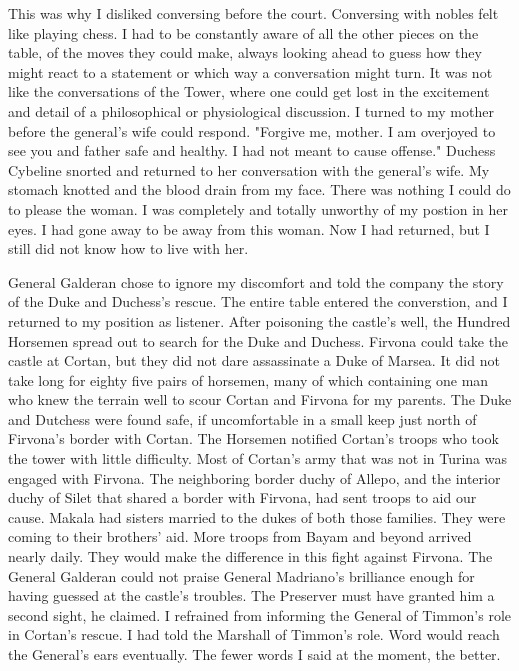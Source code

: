 \documentclass{article}
\begin{document}
This was why I disliked conversing before the court. Conversing with nobles felt like playing chess. I had to be constantly aware of all the other pieces on the table, of the moves they could make, always looking ahead to guess how they might react to a statement or which way a conversation might turn. It was not like the conversations of the Tower, where one could get lost in the excitement and detail of a philosophical or physiological discussion. I turned to my mother before the general's wife could respond. "Forgive me, mother. I am overjoyed to see you and father safe and healthy. I had not meant to cause offense." Duchess Cybeline snorted and returned to her conversation with the general's wife. My stomach knotted and the blood drain from my face. There was nothing I could do to please the woman. I was completely and totally unworthy of my postion in her eyes. I had gone away to be away from this woman. Now I had returned, but I still did not know how to live with her.

General Galderan chose to ignore my discomfort and told the company the story of the Duke and Duchess's rescue. The entire table entered the converstion, and I returned to my position as listener. After poisoning the castle's well, the Hundred Horsemen spread out to search for the Duke and Duchess. Firvona could take the castle at Cortan, but they did not dare assassinate a Duke of Marsea. It did not take long for eighty five pairs of horsemen, many of which containing one man who knew the terrain well to scour Cortan and Firvona for my parents. The Duke and Dutchess were found safe, if uncomfortable in a small keep just north of Firvona's border with Cortan. The Horsemen notified Cortan's troops who took the tower with little difficulty. Most of Cortan's army that was not in Turina was engaged with Firvona. The neighboring border duchy of Allepo, and the interior duchy of Silet that shared a border with Firvona, had sent troops to aid our cause. Makala had sisters married to the dukes of both those families. They were coming to their brothers' aid. More troops from Bayam and beyond arrived nearly daily. They would make the difference in this fight against Firvona. The General Galderan could not praise General Madriano's brilliance enough for having guessed at the castle's troubles. The Preserver must have granted him a second sight, he claimed. I refrained from informing the General of Timmon's role in Cortan's rescue. I had told the Marshall of Timmon's role. Word would reach the General's ears eventually. The fewer words I said at the moment, the better. 
\end{document}
